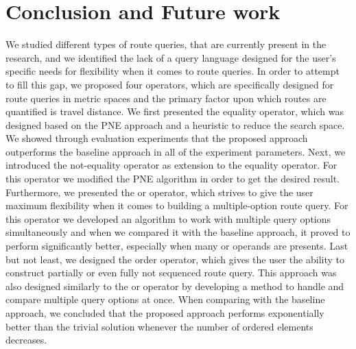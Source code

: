\chapter{Conclusion and Future work}
\label{sec:conclusion}
We studied different types of route queries, that are currently present in the research, and we identified the lack of a query language designed for the user's specific needs for flexibility when it comes to route queries. In order to attempt to fill this gap, we proposed four operators, which are specifically designed for route queries in metric spaces and the primary factor upon which routes are quantified is travel distance. 
We first presented the equality operator, which was designed based on the PNE approach \cite{OSR} and a heuristic to reduce the search space. We showed through evaluation experiments that the proposed approach outperforms the baseline approach in all of the experiment parameters. Next, we introduced the not-equality operator as extension to the equality operator. For this operator we modified the PNE algorithm in order to get the desired result. Furthermore, we presented the or operator, which strives to give the user maximum flexibility when it comes to building a multiple-option route query. For this operator we developed an algorithm to work with multiple query options simultaneously and when we compared it with the baseline approach, it proved to perform significantly better, especially when many or operands are presents. Last but not least, we designed the order operator, which gives the user the ability to construct partially or even fully not sequenced route query. This approach was also designed similarly to the or operator by developing a method to handle and compare multiple query options at once. When comparing with the baseline approach, we concluded that the proposed approach performs exponentially better than the trivial solution whenever the number of ordered elements decreases.

